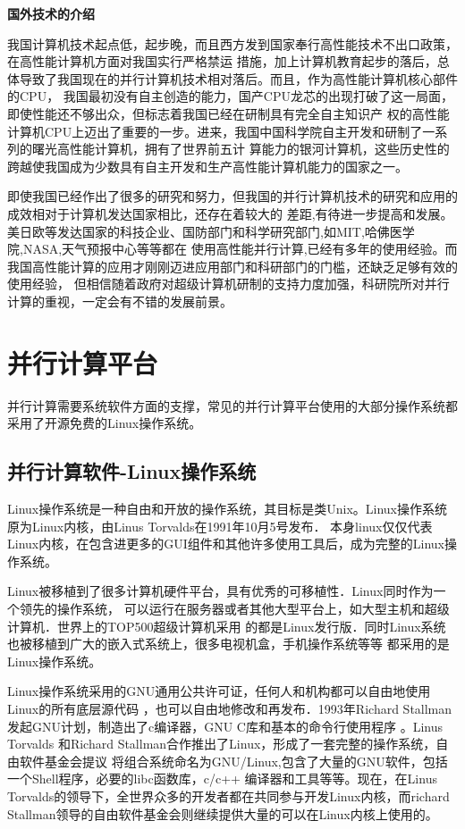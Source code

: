     \textbf{国外技术的介绍}

    我国计算机技术起点低，起步晚，而且西方发到国家奉行高性能技术不出口政策，在高性能计算机方面对我国实行严格禁运
措施，加上计算机教育起步的落后，总体导致了我国现在的并行计算机技术相对落后。而且，作为高性能计算机核心部件的CPU，
我国最初没有自主创造的能力，国产CPU龙芯的出现打破了这一局面，即使性能还不够出众，但标志着我国已经在研制具有完全自主知识产
权的高性能计算机CPU上迈出了重要的一步。进来，我国中国科学院自主开发和研制了一系列的曙光高性能计算机，拥有了世界前五计
算能力的银河计算机，这些历史性的跨越使我国成为少数具有自主开发和生产高性能计算机能力的国家之一。

    即使我国已经作出了很多的研究和努力，但我国的并行计算机技术的研究和应用的成效相对于计算机发达国家相比，还存在着较大的
差距,有待进一步提高和发展。美日欧等发达国家的科技企业、国防部门和科学研究部门,如MIT,哈佛医学院,NASA,天气预报中心等等都在
使用高性能并行计算,已经有多年的使用经验。而我国高性能计算的应用才刚刚迈进应用部门和科研部门的门槛，还缺乏足够有效的使用经验，
但相信随着政府对超级计算机研制的支持力度加强，科研院所对并行计算的重视，一定会有不错的发展前景\cite{Zhangzhihong}。

\section{并行计算平台}
    并行计算需要系统软件方面的支撑，常见的并行计算平台使用的大部分操作系统都采用了开源免费的Linux操作系统。

\subsection{并行计算软件-Linux操作系统}
    Linux操作系统是一种自由和开放的操作系统，其目标是类Unix。Linux操作系统原为Linux内核，由Linus Torvalds在1991年10月5号发布．
本身linux仅仅代表Linux内核，在包含进更多的GUI组件和其他许多使用工具后，成为完整的Linux操作系统。

    Linux被移植到了很多计算机硬件平台，具有优秀的可移植性．Linux同时作为一个领先的操作系统，
可以运行在服务器或者其他大型平台上，如大型主机和超级计算机．世界上的TOP500超级计算机采用
的都是Linux发行版．同时Linux系统也被移植到广大的嵌入式系统上，很多电视机盒，手机操作系统等等
都采用的是Linux操作系统。

    Linux操作系统采用的GNU通用公共许可证，任何人和机构都可以自由地使用Linux的所有底层源代码
，也可以自由地修改和再发布．1993年Richard Stallman发起GNU计划，制造出了c编译器，GNU C库和基本的命令行使用程序
。Linus Torvalds 和Richard Stallman合作推出了Linux，形成了一套完整的操作系统，自由软件基金会提议
将组合系统命名为GNU/Linux,包含了大量的GNU软件，包括一个Shell程序，必要的libc函数库，c/c++
编译器和工具等等。现在，在Linus Torvalds的领导下，全世界众多的开发者都在共同参与开发Linux内核，而richard 
Stallman领导的自由软件基金会则继续提供大量的可以在Linux内核上使用的。

